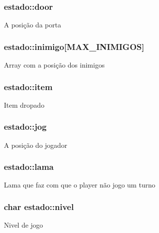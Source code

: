 \subsubsection[{\texorpdfstring{door}{door}}]{ estado\+::door}\hypertarget{structestado_a7415ebf0dc1fbc535407bb2bd669dc81}{}\label{structestado_a7415ebf0dc1fbc535407bb2bd669dc81}
A posição da porta 
\subsubsection[{\texorpdfstring{inimigo}{inimigo}}]{ estado\+::inimigo\mbox{[}{\bf M\+A\+X\+\_\+\+I\+N\+I\+M\+I\+G\+OS}\mbox{]}}\hypertarget{structestado_a85c620d8bd760efde2d2681df831dcb2}{}\label{structestado_a85c620d8bd760efde2d2681df831dcb2}
Array com a posição dos inimigos 
\subsubsection[{\texorpdfstring{item}{item}}]{ estado\+::item}\hypertarget{structestado_a2c147e6348aeaa62b05ff2109f0f2bf4}{}\label{structestado_a2c147e6348aeaa62b05ff2109f0f2bf4}
Item dropado 
\subsubsection[{\texorpdfstring{jog}{jog}}]{ estado\+::jog}\hypertarget{structestado_aba384d85c8fd0406b06aa2f478874bc1}{}\label{structestado_aba384d85c8fd0406b06aa2f478874bc1}
A posição do jogador 
\subsubsection[{\texorpdfstring{lama}{lama}}]{ estado\+::lama}\hypertarget{structestado_a85a6f9c990b282dbc2f6c68d36a4462f}{}\label{structestado_a85a6f9c990b282dbc2f6c68d36a4462f}
Lama que faz com que o player não jogo um turno 
\subsubsection[{\texorpdfstring{nivel}{nivel}}]{\setlength{\rightskip}{0pt plus 5cm}char estado\+::nivel}\hypertarget{structestado_a620f2f81ebfe4cba1d6e44b09a1762f7}{}\label{structestado_a620f2f81ebfe4cba1d6e44b09a1762f7}
Nivel de jogo 
